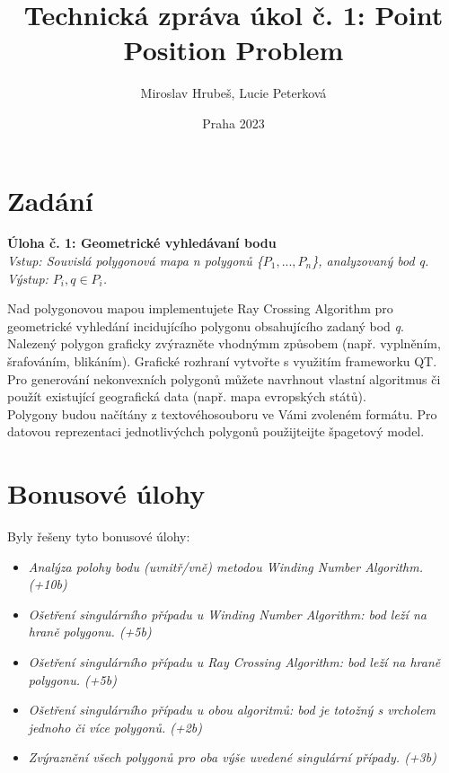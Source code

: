 \documentclass[a4paper,12pt]{article}
\title{Technická zpráva úkol č. 1: Point Position Problem}
\author{Miroslav Hrubeš, Lucie Peterková}
\date{Praha 2023}
\begin{document}
    \maketitle
    \newpage
    \section{Zadání}
    \textbf{Úloha č. 1: Geometrické vyhledávaní bodu}\\
    \textit{Vstup: Souvislá polygonová mapa n polygonů \{$P_1, ..., P_n$\}, analyzovaný bod q.}\\
    \textit{Výstup: $P_i, q \in P_i$.}

    Nad polygonovou mapou implementujete Ray Crossing Algorithm pro geometrické vyhledání incidujícího polygonu obsahujícího zadaný bod \emph{q}.\\

    Nalezený polygon graficky zvýrazněte vhodnýmm způsobem (např. vyplněním, šrafováním, blikáním). Grafické rozhraní vytvořte s využitím frameworku QT.\\

    Pro generování nekonvexních polygonů můžete navrhnout vlastní algoritmus či použít existující geografická data (např. mapa evropských států).\\

    Polygony budou načítány z textovéhosouboru ve Vámi zvoleném formátu. Pro datovou reprezentaci jednotlivýchch polygonů použijteijte špagetový model.

    
    \section{Bonusové úlohy}
    Byly řešeny tyto bonusové úlohy:\\
    \begin{itemize}
    \item \emph{Analýza polohy bodu (uvnitř/vně) metodou Winding Number Algorithm. (+10b)}
    
    \item \emph{Ošetření singulárního případu u Winding Number Algorithm: bod leží na hraně polygonu. (+5b)}
    
    \item \emph{Ošetření singulárního případu u Ray Crossing Algorithm: bod leží na hraně polygonu. (+5b)}
    
    \item \emph{Ošetření singulárního případu u obou algoritmů: bod je totožný s vrcholem jednoho či více polygonů. (+2b)}
    
    \item \emph{Zvýraznění všech polygonů pro oba výše uvedené singulární případy.  (+3b)}
     
    \end{itemize}
    
\end{document}
